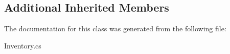 \subsection*{Additional Inherited Members}


The documentation for this class was generated from the following file\-:\begin{DoxyCompactItemize}
\item 
Inventory.\-cs\end{DoxyCompactItemize}
